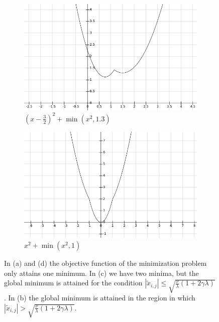 \documentclass[abstracton]{scrreprt}
\begin{document}
\begin{figure}[!ht]
\begin{subfigure}[b]{0.49\textwidth}
                    \begin{framed}
                        \includegraphics[width=\textwidth]{img/f_4.png}
                        \caption{$(x-\frac{3}{2})^{2} + \min(x^{2}, 1.3)$}
                    \end{framed}
                \end{subfigure}
                \begin{subfigure}[b]{0.49\textwidth}
                    \begin{framed}
                        \includegraphics[width=\textwidth]{img/f_5.png}
                        \caption{$x^{2} + \min(x^{2}, 1)$}
                    \end{framed}
                \end{subfigure}
                \caption[Plot of a objective function within a minimum function.]{In (a) and (d) the objective function of the minimization problem only attains one minimum. In (c) we have two minima, but the global minimum is attained for the condition $|\tilde{x}_{i,j}| \le \sqrt{\frac{\nu}{\lambda}(1 + 2\gamma\lambda)}$. In (b) the global minimum is attained in the region in which $|\tilde{x}_{i,j}| > \sqrt{\frac{\nu}{\lambda}(1 + 2\gamma\lambda)}$.}
                \label{fig:objective_function}
            \end{figure}
\end{document}
